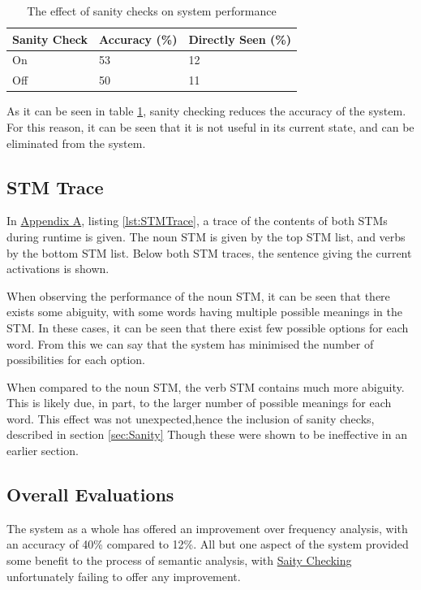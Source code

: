 \documentclass[]{article}
\begin{document}
\begin{table}
\begin{center}
\begin{tabular}{|p{5em}|p{7em}|p{7em}|}
	\hline
	Sanity Check & Accuracy (\%) & Directly Seen (\%) \\
	\hline
	On & 53 & 12\\
	\hline
	Off & 50 & 11\\
	\hline
\end{tabular}
\end{center}
\caption{The effect of sanity checks on system performance}
\label{table:Sanity}
\end{table}

As it can be seen in table \ref{table:Sanity}, sanity checking reduces the accuracy of the system. For this reason, it can be seen that it is not useful in its current state, and can be eliminated from the system.

\subsection{STM Trace}
\label{sec:EvTrace}
In \hyperref[sec:AppA]{Appendix A}, listing \ref{lst:STMTrace}, a trace of the contents of both STMs during runtime is given. The noun STM is given by the top STM list, and verbs by the bottom STM list. Below both STM traces, the sentence giving the current activations is shown.

When observing the performance of the noun STM, it can be seen that there exists some abiguity, with some words having multiple possible meanings in the STM. In these cases, it can be seen that there exist few possible options for each word. From this we can say that the system has minimised the number of possibilities for each option.

When compared to the noun STM, the verb STM contains much more abiguity. This is likely due, in part, to the larger number of possible meanings for each word. This effect was not unexpected,hence the inclusion of sanity checks, described in section \ref{sec:Sanity} Though these were shown to be ineffective in an earlier section.

\subsection{Overall Evaluations}
\label{EvOverall}
The system as a whole has offered an improvement over frequency analysis, with an accuracy of 40\% compared to 12\%. All but one aspect of the system provided some benefit to the process of semantic analysis, with \hyperref[sec:EvDisSanity]{Saity Checking} unfortunately failing to offer any improvement. 
\end{document}

